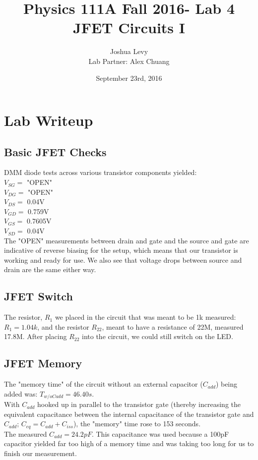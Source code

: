 \documentclass{article}
\title{Physics 111A Fall 2016- Lab 4\\
JFET Circuits I}
\author{Joshua Levy\\Lab Partner: Alex Chuang}
\date{September 23rd, 2016}
\begin{document}
\maketitle

\section{Lab Writeup}
\subsection{Basic JFET Checks}
    DMM diode tests across various transistor components yielded:\\
    \indent $V_{SG} = $ "OPEN"\\
    \indent $V_{DG} = $ "OPEN"\\
    \indent $V_{DS} = $ 0.04V\\
    \indent $V_{GD} = $ 0.759V\\
    \indent $V_{GS} = $ 0.7605V\\
    \indent $V_{SD} = $ 0.04V\\
    The "OPEN" measurements between drain and gate and the source and gate are indicative of reverse biasing for the setup, which means that our transistor is working and ready for use. We also see that voltage drops between source and drain are the same either way.

\subsection{JFET Switch}
    The resistor, $R_{1}$ we placed in the circuit that was meant to be 1k measured: $R_{1} = 1.04k$, and the resistor $R_{22}$, meant to have a resistance of 22M, measured 17.8M. After placing $R_{22}$ into the circuit, we could still switch on the LED.

\subsection{JFET Memory}
    The "memory time" of the circuit without an external capacitor ($C_{add}$) being added was: $T_{w/oCadd} = 46.40s$. \\\indent With $C_{add}$ hooked up in parallel to the transistor gate  (thereby increasing the equivalent capacitance between the internal capacitance of the transistor gate and $C_{add}$; $C_{eq} = C_{add} + C_{iss}$), the "memory" time rose to 153 seconds. \\\indent The measured $C_{add} = 24.2 pF$. This capacitance was used because a 100pF capacitor yielded far too high of a memory time and was taking too long for us to finish our measurement.
\end{document}
